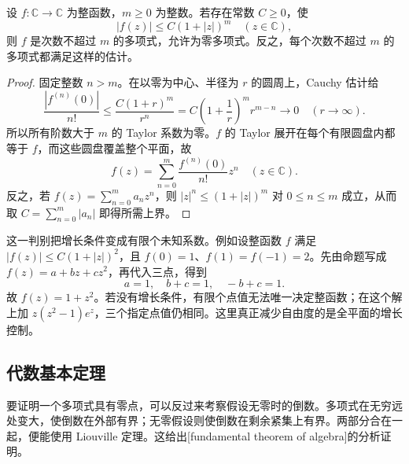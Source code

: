 \begin{proposition}[多项式增长判别]\label{b3:prop:02-polynomial-growth}
设 \(f:\mathbb C\to\mathbb C\) 为整函数，\(m\ge0\) 为整数。若存在常数 \(C\ge0\)，使
\[
 |f(z)|\le C(1+|z|)^m\quad(z\in\mathbb C),
\]
则 \(f\) 是次数不超过 \(m\) 的多项式，允许为零多项式。反之，每个次数不超过 \(m\) 的多项式都满足这样的估计。
\end{proposition}
\begin{proof}
固定整数 \(n>m\)。在以零为中心、半径为 \(r\) 的圆周上，Cauchy 估计给
\[
 \frac{|f^{(n)}(0)|}{n!}
 \le\frac{C(1+r)^m}{r^n}
 =C\left(1+\frac1r\right)^m r^{m-n}\longrightarrow0
 \quad(r\to\infty).
\]
所以所有阶数大于 \(m\) 的 Taylor 系数为零。\(f\) 的 Taylor 展开在每个有限圆盘内都等于 \(f\)，而这些圆盘覆盖整个平面，故
\[
 f(z)=\sum_{n=0}^m\frac{f^{(n)}(0)}{n!}z^n
 \quad(z\in\mathbb C).
\]
反之，若 \(f(z)=\sum_{n=0}^m a_nz^n\)，则 \(|z|^n\le(1+|z|)^m\) 对 \(0\le n\le m\) 成立，从而取 \(C=\sum_{n=0}^m|a_n|\) 即得所需上界。
\end{proof}

这一判别把增长条件变成有限个未知系数。例如设整函数 \(f\) 满足 \(|f(z)|\le C(1+|z|)^2\)，且 \(f(0)=1\)、\(f(1)=f(-1)=2\)。先由命题写成 \(f(z)=a+bz+cz^2\)，再代入三点，得到
\[
 a=1,\quad b+c=1,\quad -b+c=1.
\]
故 \(f(z)=1+z^2\)。若没有增长条件，有限个点值无法唯一决定整函数；在这个解上加 \(z(z^2-1)e^z\)，三个指定点值仍相同。这里真正减少自由度的是全平面的增长控制。

\subsection{代数基本定理}
\label{b3:subsec:020402}

要证明一个多项式具有零点，可以反过来考察假设无零时的倒数。多项式在无穷远处变大，使倒数在外部有界；无零假设则使倒数在剩余紧集上有界。两部分合在一起，便能使用 Liouville 定理。这给出[fundamental theorem of algebra]的分析证明。

